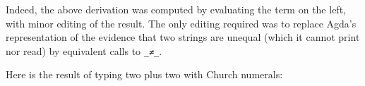 Indeed, the above derivation was computed by evaluating the term on the
left, with minor editing of the result. The only editing required was to
replace Agda's representation of the evidence that two strings are
unequal (which it cannot print nor read) by equivalent calls to
\texttt{\_≠\_}.

Here is the result of typing two plus two with Church numerals:

\begin{fence}
\begin{code}%
\>[0]\AgdaSpace{}%
\AgdaSymbol{:}\AgdaSpace{}%
\AgdaSpace{}%
\AgdaSpace{}%
\AgdaSpace{}%
\AgdaSpace{}%
\<%
\\
\>[0]\AgdaSpace{}%
\AgdaSymbol{=}\<%
\\
\>[0][@{}l@{\AgdaIndent{0}}]%
\>[2]\<%
\\
%
\>[2]\AgdaSymbol{(}\<%
\\
\>[2][@{}l@{\AgdaIndent{0}}]%
\>[3]\AgdaSymbol{(}\<%
\\
\>[3][@{}l@{\AgdaIndent{0}}]%
\>[4]\AgdaSymbol{(}\<%
\\
\>[4][@{}l@{\AgdaIndent{0}}]%
\>[5]\AgdaSymbol{(}\<%
\\
\>[5][@{}l@{\AgdaIndent{0}}]%
\>[6]\AgdaSymbol{(}\<%
\\
\>[6][@{}l@{\AgdaIndent{0}}]%
\>[7]\AgdaSymbol{(}\<%
\\
\>[7][@{}l@{\AgdaIndent{0}}]%
\>[8]\AgdaSymbol{(}\AgdaSpace{}%
\AgdaSymbol{(}\AgdaSpace{}%
\AgdaSpace{}%
\AgdaSymbol{)}\<%
\\
\>[8][@{}l@{\AgdaIndent{0}}]%
\>[9]\AgdaSymbol{(}\AgdaSpace{}%
\AgdaSymbol{(}\AgdaSpace{}%
\AgdaSpace{}%
\AgdaSymbol{)}\<%
\\
\>[9][@{}l@{\AgdaIndent{0}}]%
\>[10]\AgdaSymbol{(}\AgdaSpace{}%
\AgdaSymbol{(}\AgdaSpace{}%
\AgdaSpace{}%
\AgdaSymbol{)}\AgdaSpace{}%
\AgdaSymbol{)))}\<%
\\

\end{code}
\end{fence}

